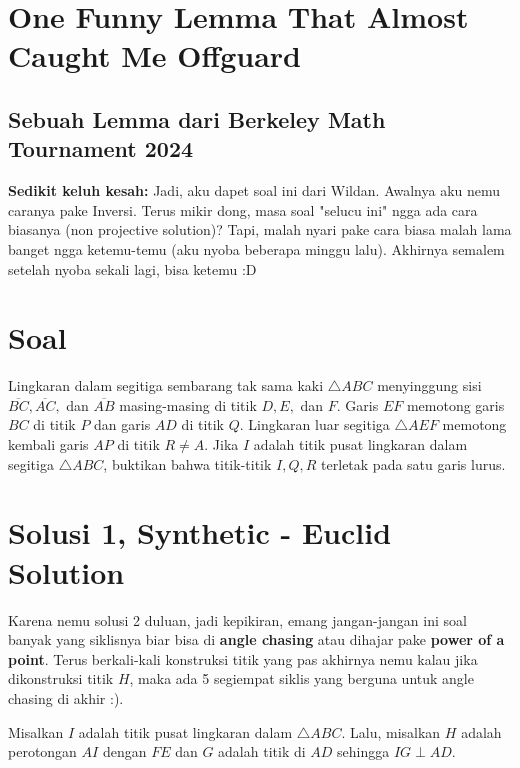 \section*{One Funny Lemma That Almost Caught Me Offguard}
\subsection*{Sebuah Lemma dari Berkeley Math Tournament 2024}
\textbf{Sedikit keluh kesah:} Jadi, aku dapet soal ini dari Wildan. Awalnya aku nemu caranya pake Inversi. Terus mikir dong, masa soal "selucu ini" ngga ada cara biasanya (non projective solution)? Tapi, malah nyari pake cara biasa malah lama banget ngga ketemu-temu (aku nyoba beberapa minggu lalu). Akhirnya semalem setelah nyoba sekali lagi, bisa ketemu :D

\section{Soal}
Lingkaran dalam segitiga sembarang tak sama kaki $\triangle ABC$ menyinggung sisi $\overline{BC}, \overline{AC},$ dan $\overline{AB}$ masing-masing di titik $D, E,$ dan $F$. Garis $EF$ memotong garis $BC$ di titik $P$ dan garis $AD$ di titik $Q$. Lingkaran luar segitiga $\triangle AEF$ memotong kembali garis $AP$ di titik $R \neq A$. Jika $I$ adalah titik pusat lingkaran dalam segitiga $\triangle ABC$, buktikan bahwa titik-titik $I, Q, R$ terletak pada satu garis lurus.



\newpage
\section{Solusi 1, Synthetic - Euclid Solution}
    \begin{remark*}[Motivasi]
        Karena nemu solusi 2 duluan, jadi kepikiran, emang jangan-jangan ini soal banyak yang siklisnya biar bisa di \textbf{angle chasing} atau dihajar pake \textbf{power of a point}. Terus berkali-kali konstruksi titik yang pas akhirnya nemu kalau jika dikonstruksi titik $H$, maka ada 5 segiempat siklis yang berguna untuk angle chasing di akhir :).
    \end{remark*}
    Misalkan $I$ adalah titik pusat lingkaran dalam $\triangle ABC$. Lalu, misalkan $H$ adalah perotongan $AI$ dengan $FE$ dan $G$ adalah titik di $AD$ sehingga $IG \perp AD$.

    
    
